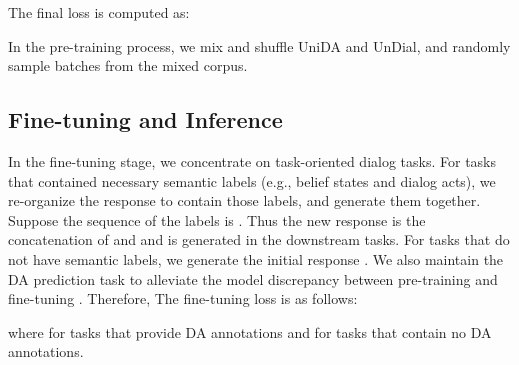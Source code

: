 \documentclass[letterpaper]{article} \usepackage{aaai22}  \usepackage{times}  \usepackage{helvet}  \usepackage{courier}  \usepackage[hyphens]{url}  \usepackage{graphicx} \urlstyle{rm} \def\UrlFont{\rm}  \usepackage{natbib}  \usepackage{caption} \DeclareCaptionStyle{ruled}{labelfont=normalfont,labelsep=colon,strut=off} \frenchspacing  \setlength{\pdfpagewidth}{8.5in}  \setlength{\pdfpageheight}{11in}  \usepackage{algorithm}
\begin{document}
The final loss  is computed as:


In the pre-training process, we mix and shuffle UniDA and UnDial, and randomly sample batches from the mixed corpus.






\subsection{Fine-tuning and Inference}
In the fine-tuning stage, we concentrate on task-oriented dialog tasks. For tasks that contained necessary semantic labels (e.g., belief states and dialog acts), we re-organize the response  to contain those labels, and generate them together. Suppose the sequence of the labels is . Thus the new response  is the concatenation of  and  and is generated in the downstream tasks. For tasks that do not have semantic labels, we generate the initial response .
We also maintain the DA prediction task to alleviate the model discrepancy between pre-training and fine-tuning \cite{zenginvestigation}. Therefore, The fine-tuning loss is as follows:

where  for tasks that provide DA annotations and  for tasks that contain no DA annotations.
\end{document}
